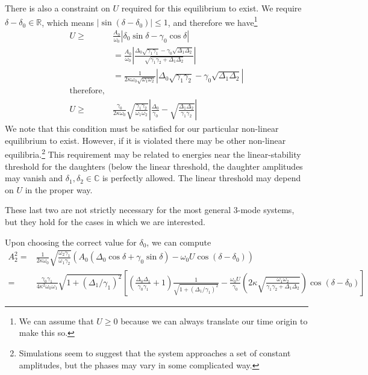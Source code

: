 There is also a constraint on $U$ required for this equilibrium to exist. We require $\delta-\delta_0 \in \mathbb{R}$, which means $|\sin(\delta-\delta_0)| \leq 1$, and therefore we have\footnote{We can assume that $U\geq0$ because we can always translate our time origin to make this so.}
\begin{subequations}
\begin{align}
U \geq & \frac{A_0}{\omega_0}\left|\delta_0\sin\delta - \gamma_0\cos\delta\right|  \\
       & = \frac{A_0}{\omega_0}\left| \frac{\Delta_0 \sqrt{\gamma_1\gamma_1} - \gamma_0\sqrt{\Delta_1\Delta_2}}{\sqrt{\gamma_1\gamma_2 + \Delta_1\Delta_2}}\right| \\
       & = \frac{1}{2\kappa\omega_0\sqrt{\omega_1\omega_2}}\left| \Delta_0\sqrt{\gamma_1\gamma_2} - \gamma_0\sqrt{\Delta_1\Delta_2} \right| \\
\mathrm{therefore,} & \\
U \geq & \frac{\gamma_0}{2\kappa\omega_0}\sqrt{\frac{\gamma_1\gamma_2}{\omega_1\omega_2}}\left| \frac{\Delta_0}{\gamma_0} - \sqrt{\frac{\Delta_1\Delta_2}{\gamma_1\gamma_2}} \right|
\end{align}
\end{subequations}
We note that this condition must be satisfied for our particular non-linear equilibrium to exist. However, if it is violated there may be other non-linear equilibria.\footnote{Simulations seem to suggest that the system approaches a set of constant amplitudes, but the phases may vary in some complicated way.} This requirement may be related to energies near the linear-stability threshold for the daughters (below the linear threshold, the daughter amplitudes may vanish and $\delta_1,\delta_2 \in \mathbb{C}$ is perfectly allowed. The linear threshold may depend on $U$ in the proper way.

These last two are not strictly necessary for the most general 3-mode systems, but they hold for the cases in which we are interested.

Upon choosing the correct value for $\delta_0$, we can compute
\begin{subequations}
\begin{align}
A_2^2 = &  \frac{1}{2\kappa\omega_0} \sqrt{\frac{\omega_2\gamma_1}{\omega_1\gamma_2}} \left(A_0 (\Delta_0 \cos{\delta} + \gamma_0 \sin{\delta}) -\omega_0 U \cos(\delta-\delta_0)\right) \\
      = & \frac{\gamma_0\gamma_1}{4\kappa^2\omega_0\omega_1}\sqrt{1+(\Delta_1/\gamma_1)^2}\left[ \left(\frac{\Delta_0\Delta_1}{\gamma_0\gamma_1} + 1 \right)\frac{1}{\sqrt{1+(\Delta_1/\gamma_1)^2}} - \frac{\omega_0 U}{\gamma_0}\left(2\kappa\sqrt{\frac{\omega_1\omega_2}{\gamma_1\gamma_2 + \Delta_1\Delta_2}}\right)\cos(\delta - \delta_0)\right] 
\end{align}
\end{subequations}

